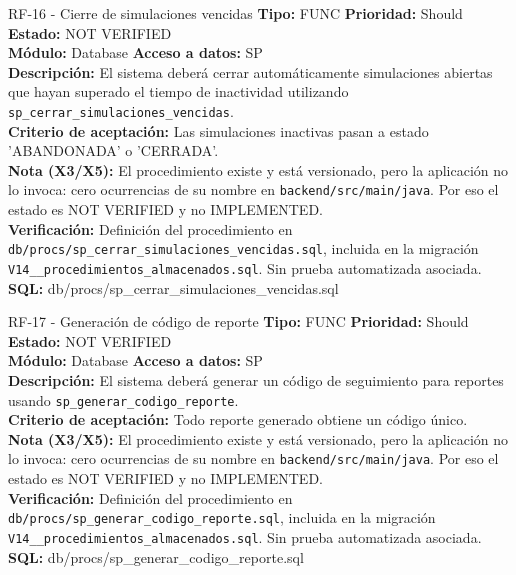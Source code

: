 \documentclass[11pt,a4paper]{article}
\begin{document}
\begin{requisito}{RF-16 - Cierre de simulaciones vencidas}
    \textbf{Tipo:} FUNC \quad \textbf{Prioridad:} Should \quad \textbf{Estado:} NOT VERIFIED \\[0.2cm]
    \textbf{Módulo:} Database \quad \textbf{Acceso a datos:} SP \\[0.2cm]
    \textbf{Descripción:} El sistema deberá cerrar automáticamente simulaciones abiertas que hayan superado el tiempo de inactividad utilizando \texttt{sp\_cerrar\_simulaciones\_vencidas}. \\[0.2cm]
    \textbf{Criterio de aceptación:} Las simulaciones inactivas pasan a estado 'ABANDONADA' o 'CERRADA'. \\[0.2cm]
    \textbf{Nota (X3/X5):} El procedimiento existe y está versionado, pero la aplicación no lo invoca: cero ocurrencias de su nombre en \texttt{backend/src/main/java}. Por eso el estado es NOT VERIFIED y no IMPLEMENTED. \\[0.2cm]
    \textbf{Verificación:} Definición del procedimiento en \texttt{db/procs/sp\_cerrar\_simulaciones\_vencidas.sql}, incluida en la migración \texttt{V14\_\_procedimientos\_almacenados.sql}. Sin prueba automatizada asociada. \quad \textbf{SQL:} db/procs/sp\_cerrar\_simulaciones\_vencidas.sql
\end{requisito}

\begin{requisito}{RF-17 - Generación de código de reporte}
    \textbf{Tipo:} FUNC \quad \textbf{Prioridad:} Should \quad \textbf{Estado:} NOT VERIFIED \\[0.2cm]
    \textbf{Módulo:} Database \quad \textbf{Acceso a datos:} SP \\[0.2cm]
    \textbf{Descripción:} El sistema deberá generar un código de seguimiento para reportes usando \texttt{sp\_generar\_codigo\_reporte}. \\[0.2cm]
    \textbf{Criterio de aceptación:} Todo reporte generado obtiene un código único. \\[0.2cm]
    \textbf{Nota (X3/X5):} El procedimiento existe y está versionado, pero la aplicación no lo invoca: cero ocurrencias de su nombre en \texttt{backend/src/main/java}. Por eso el estado es NOT VERIFIED y no IMPLEMENTED. \\[0.2cm]
    \textbf{Verificación:} Definición del procedimiento en \texttt{db/procs/sp\_generar\_codigo\_reporte.sql}, incluida en la migración \texttt{V14\_\_procedimientos\_almacenados.sql}. Sin prueba automatizada asociada. \quad \textbf{SQL:} db/procs/sp\_generar\_codigo\_reporte.sql
\end{requisito}
\end{document}

